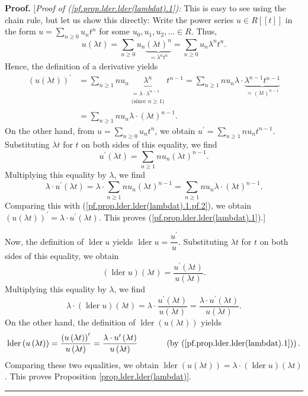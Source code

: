\documentclass[numbers=enddot,12pt,final,onecolumn,notitlepage]{scrartcl}%
\theoremstyle{definition}
\newenvironment{proof}[1][Proof]{\noindent\textbf{#1.} }{\ \rule{0.5em}{0.5em}}
\let\sumnonlimits\sum
\renewcommand{\sum}{\sumnonlimits\limits}
\newenvironment{verlong}{}{}
\begin{document}
\begin{verlong}
\begin{proof}
[\textit{Proof of (\ref{pf.prop.lder.lder(lambdat).1}):} This is easy to see
using the chain rule, but let us show this directly: Write the power series
$u\in R\left[  \left[  t\right]  \right]  $ in the form $u=\sum_{n\geq0}%
u_{n}t^{n}$ for some $u_{0},u_{1},u_{2},\ldots\in R$. Thus,
\[
u\left(  \lambda t\right)  =\sum_{n\geq0}u_{n}\underbrace{\left(  \lambda
t\right)  ^{n}}_{=\lambda^{n}t^{n}}=\sum_{n\geq0}u_{n}\lambda^{n}t^{n}.
\]
Hence, the definition of a derivative yields%
\begin{align}
\left(  u\left(  \lambda t\right)  \right)  ^{\prime}  &  =\sum_{n\geq1}%
nu_{n}\underbrace{\lambda^{n}}_{\substack{=\lambda\cdot\lambda^{n-1}%
\\\text{(since }n\geq1\text{)}}}t^{n-1}=\sum_{n\geq1}nu_{n}\lambda
\cdot\underbrace{\lambda^{n-1}t^{n-1}}_{=\left(  \lambda t\right)  ^{n-1}%
}\nonumber\\
&  =\sum_{n\geq1}nu_{n}\lambda\cdot\left(  \lambda t\right)  ^{n-1}.
\label{pf.prop.lder.lder(lambdat).1.pf.2}%
\end{align}
On the other hand, from $u=\sum_{n\geq0}u_{n}t^{n}$, we obtain $u^{\prime
}=\sum_{n\geq1}nu_{n}t^{n-1}$. Substituting $\lambda t$ for $t$ on both sides
of this equality, we find%
\[
u^{\prime}\left(  \lambda t\right)  =\sum_{n\geq1}nu_{n}\left(  \lambda
t\right)  ^{n-1}.
\]
Multiplying this equality by $\lambda$, we find%
\[
\lambda\cdot u^{\prime}\left(  \lambda t\right)  =\lambda\cdot\sum_{n\geq
1}nu_{n}\left(  \lambda t\right)  ^{n-1}=\sum_{n\geq1}nu_{n}\lambda
\cdot\left(  \lambda t\right)  ^{n-1}.
\]
Comparing this with (\ref{pf.prop.lder.lder(lambdat).1.pf.2}), we obtain
$\left(  u\left(  \lambda t\right)  \right)  ^{\prime}=\lambda\cdot u^{\prime
}\left(  \lambda t\right)  $. This proves (\ref{pf.prop.lder.lder(lambdat).1}).]

Now, the definition of $\operatorname*{lder}u$ yields $\operatorname*{lder}%
u=\dfrac{u^{\prime}}{u}$. Substituting $\lambda t$ for $t$ on both sides of
this equality, we obtain
\[
\left(  \operatorname*{lder}u\right)  \left(  \lambda t\right)  =\dfrac
{u^{\prime}\left(  \lambda t\right)  }{u\left(  \lambda t\right)  }.
\]
Multiplying this equality by $\lambda$, we find%
\[
\lambda\cdot\left(  \operatorname*{lder}u\right)  \left(  \lambda t\right)
=\lambda\cdot\dfrac{u^{\prime}\left(  \lambda t\right)  }{u\left(  \lambda
t\right)  }=\dfrac{\lambda\cdot u^{\prime}\left(  \lambda t\right)  }{u\left(
\lambda t\right)  }.
\]
On the other hand, the definition of $\operatorname*{lder}\left(  u\left(
\lambda t\right)  \right)  $ yields%
\[
\operatorname*{lder}\left(  u\left(  \lambda t\right)  \right)  =\dfrac
{\left(  u\left(  \lambda t\right)  \right)  ^{\prime}}{u\left(  \lambda
t\right)  }=\dfrac{\lambda\cdot u^{\prime}\left(  \lambda t\right)  }{u\left(
\lambda t\right)  }\ \ \ \ \ \ \ \ \ \ \left(  \text{by
(\ref{pf.prop.lder.lder(lambdat).1})}\right)  .
\]
Comparing these two equalities, we obtain $\operatorname*{lder}\left(
u\left(  \lambda t\right)  \right)  =\lambda\cdot\left(  \operatorname*{lder}%
u\right)  \left(  \lambda t\right)  $. This proves Proposition
\ref{prop.lder.lder(lambdat)}.
\end{proof}


\end{verlong}
\end{document}
